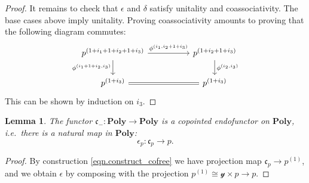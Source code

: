 \documentclass[11pt, one side, article]{memoir}
\theoremstyle{definition}
\theoremstyle{plain}
\newtheorem{lemma}[definitionx]{Lemma}
\newcommand{\Cat}[1]{\mathbf{#1}}%
\newcommand{\yon}{\mathcal{y}}
\newcommand{\poly}{\Cat{Poly}}
\newcommand{\cofree}{\mathfrak{c}}
\newcommand{\coh}[1]{^{(#1)}}
\begin{document}
\begin{proof}
It remains to check that $\epsilon$ and $\delta$ satisfy unitality and coassociativity. The base cases above imply unitality. Proving coassociativity amounts to proving that the following diagram commutes:
\[
\begin{tikzcd}[column sep=50pt]
	p\coh{1+i_1+1+i_2+1+i_3}\ar[r, "\phi\coh{i_1,i_2+1+i_3}"]\ar[d, "\phi\coh{i_1+1+i_2,i_3}"']&
	p\coh{1+i_2+1+i_3}\ar[d, "\phi\coh{i_2,i_3}"]\\
	p\coh{1+i_3}\ar[r,equal]&p\coh{1+i_3}
\end{tikzcd}
\]
This can be shown by induction on $i_3$.
\end{proof}

\begin{lemma}\label{lemma.copointed}
The functor $\cofree_-\colon\poly\to\poly$ is a copointed endofunctor on $\poly$, i.e.\ there is a natural map in $\poly$:
\[\epsilon_p\colon\cofree_p\to p.\]
\end{lemma}
\begin{proof}
By construction \eqref{eqn.construct_cofree} we have projection map $\cofree_p\to p\coh{1}$, and we obtain $\epsilon$ by composing with the projection $p\coh{1}\cong\yon\times p\to p$.
\end{proof}
\end{document}
